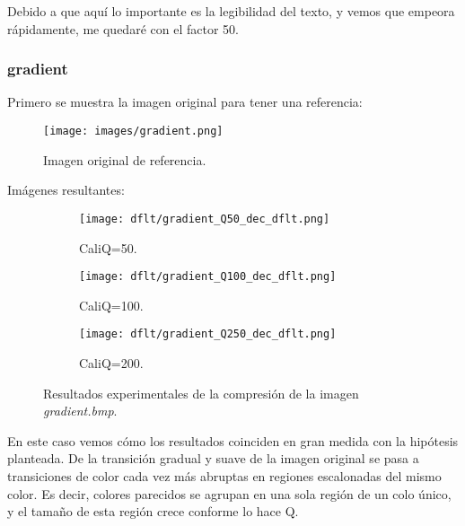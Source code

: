 \documentclass[12pt,a4paper]{article}
\begin{document}
Debido a que aquí lo importante es la legibilidad del texto, y vemos que empeora rápidamente, me quedaré con el factor 50.\\

\subsubsection{gradient}
Primero se muestra la imagen original para tener una referencia:
\begin{figure}[H]
    \centering
    \texttt{[image: images/gradient.png]}
    \caption[Referencia - gradient]{Imagen original de referencia.}
    
\end{figure}
    
    \vspace{0.5cm}

Imágenes resultantes:
\begin{figure}[H]
    
    \begin{subfigure}{0.25\textwidth}
        \centering
        \texttt{[image: dflt/gradient\_Q50\_dec\_dflt.png]}
        \caption{CaliQ=50.}
        
    \end{subfigure}
    \hfill
    \begin{subfigure}{0.25\textwidth}
        \centering
        \texttt{[image: dflt/gradient\_Q100\_dec\_dflt.png]}
        \caption{CaliQ=100.}
        
    \end{subfigure}
    \hfill
    \begin{subfigure}{0.25\textwidth}
        \centering
        \texttt{[image: dflt/gradient\_Q250\_dec\_dflt.png]}
        \caption{CaliQ=200.}
        
    \end{subfigure}
    
    
    \caption[Resultados experimentales - gradient]{Resultados experimentales de la compresión de la imagen \textit{gradient.bmp}.}
    
\end{figure}

En este caso vemos cómo los resultados coinciden en gran medida con la hipótesis planteada. De la transición gradual y suave de la imagen original se pasa a transiciones de color cada vez más abruptas en regiones escalonadas del mismo color. Es decir, colores parecidos se agrupan en una sola región de un colo único, y el tamaño de esta región crece conforme lo hace Q.\\
\end{document}
